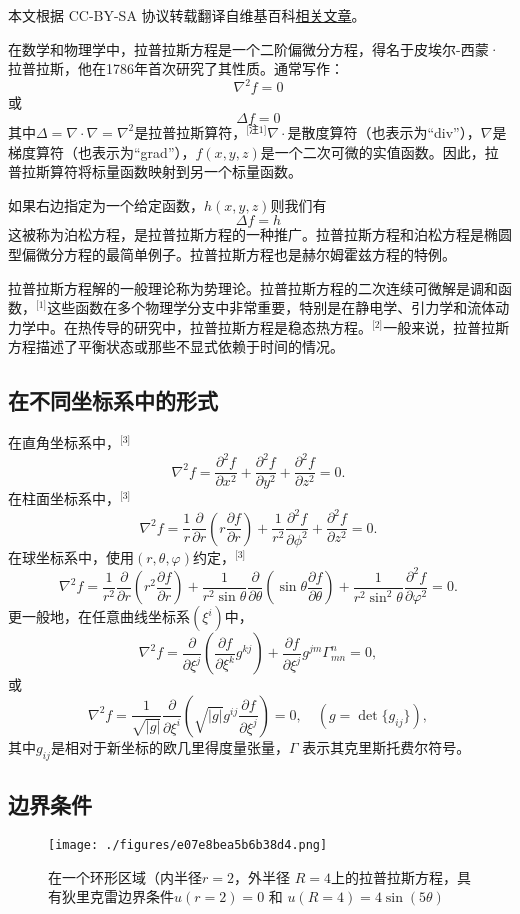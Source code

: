 
本文根据 CC-BY-SA 协议转载翻译自维基百科\href{https://en.wikipedia.org/wiki/Laplace\%27s_equation}{相关文章}。

在数学和物理学中，拉普拉斯方程是一个二阶偏微分方程，得名于皮埃尔-西蒙·拉普拉斯，他在1786年首次研究了其性质。通常写作：
\[
\nabla^2 f = 0~
\]
或
\[
\Delta f = 0~
\]
其中\(\Delta = \nabla \cdot \nabla = \nabla^2\)是拉普拉斯算符，\(^\text{[注1]}\)\(\nabla\cdot\)是散度算符（也表示为“div”），\(\nabla\)是梯度算符（也表示为“grad”），\(f(x, y, z)\)是一个二次可微的实值函数。因此，拉普拉斯算符将标量函数映射到另一个标量函数。

如果右边指定为一个给定函数，\(h(x, y, z)\)则我们有
\[
\Delta f = h~
\]
这被称为泊松方程，是拉普拉斯方程的一种推广。拉普拉斯方程和泊松方程是椭圆型偏微分方程的最简单例子。拉普拉斯方程也是赫尔姆霍兹方程的特例。

拉普拉斯方程解的一般理论称为势理论。拉普拉斯方程的二次连续可微解是调和函数，\(^\text{[1]}\)这些函数在多个物理学分支中非常重要，特别是在静电学、引力学和流体动力学中。在热传导的研究中，拉普拉斯方程是稳态热方程。\(^\text{[2]}\)一般来说，拉普拉斯方程描述了平衡状态或那些不显式依赖于时间的情况。
\subsection{在不同坐标系中的形式} 
在直角坐标系中，\(^\text{[3]}\)
\[
\nabla^2 f = \frac{\partial^2 f}{\partial x^2} + \frac{\partial^2 f}{\partial y^2} + \frac{\partial^2 f}{\partial z^2} = 0.~
\]
在柱面坐标系中，\(^\text{[3]}\)
\[
\nabla^2 f = \frac{1}{r} \frac{\partial}{\partial r} \left( r \frac{\partial f}{\partial r} \right) + \frac{1}{r^2} \frac{\partial^2 f}{\partial \phi^2} + \frac{\partial^2 f}{\partial z^2} = 0.~
\]
在球坐标系中，使用\( (r, \theta, \varphi) \)约定，\(^\text{[3]}\)
\[
\nabla^2 f = \frac{1}{r^2} \frac{\partial}{\partial r} \left( r^2 \frac{\partial f}{\partial r} \right) + \frac{1}{r^2 \sin \theta} \frac{\partial}{\partial \theta} \left( \sin \theta \frac{\partial f}{\partial \theta} \right) + \frac{1}{r^2 \sin^2 \theta} \frac{\partial^2 f}{\partial \varphi^2} = 0.~
\]
更一般地，在任意曲线坐标系\( (\xi^i) \)中，
\[
\nabla^2 f = \frac{\partial}{\partial \xi^j} \left( \frac{\partial f}{\partial \xi^k} g^{kj}\right) + \frac{\partial f}{\partial \xi^j} g^{jm}\Gamma_{mn}^n = 0,~
\]
或
\[
\nabla^2 f = \frac{1}{\sqrt{|g|}} \frac{\partial}{\partial \xi^i} \left( \sqrt{|g|} g^{ij} \frac{\partial f}{\partial \xi^j} \right) = 0, \quad (g = \det \{g_{ij}\}),~
\]
其中\( g_{ij} \)是相对于新坐标的欧几里得度量张量，\( \Gamma \) 表示其克里斯托费尔符号。
\subsection{边界条件}
\begin{figure}[ht]
\centering
\texttt{[image: ./figures/e07e8bea5b6b38d4.png]}
\caption{在一个环形区域（内半径\( r = 2 \)，外半径 \( R = 4 \)上的拉普拉斯方程，具有狄里克雷边界条件\( u(r=2) = 0 \) 和 \( u(R=4) = 4 \sin(5 \theta)\)} \label{fig_LPLSFC_1}
\end{figure}